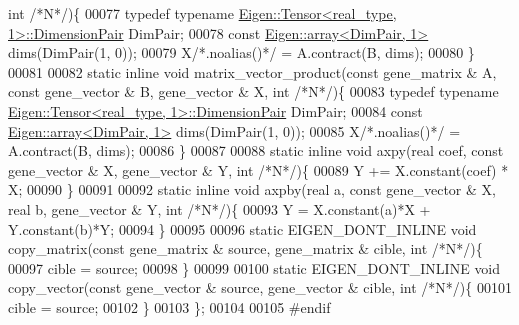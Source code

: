 \begin{DoxyCode}
{      int}  \textcolor{comment}{/*N*/})\{
00077     \textcolor{keyword}{typedef} \textcolor{keyword}{typename} \hyperlink{class_eigen_1_1_tensor}{Eigen::Tensor<real\_type, 1>::DimensionPair} 
      DimPair;
00078     \textcolor{keyword}{const} \hyperlink{class_eigen_1_1array}{Eigen::array<DimPair, 1>} dims(DimPair(1, 0));
00079     X\textcolor{comment}{/*.noalias()*/} = A.contract(B, dims);
00080   \}
00081 
00082   \textcolor{keyword}{static} \textcolor{keyword}{inline} \textcolor{keywordtype}{void} matrix\_vector\_product(\textcolor{keyword}{const} gene\_matrix & A, \textcolor{keyword}{const} gene\_vector & B, gene\_vector & X, \textcolor{keywordtype}{
      int}  \textcolor{comment}{/*N*/})\{
00083     \textcolor{keyword}{typedef} \textcolor{keyword}{typename} \hyperlink{class_eigen_1_1_tensor}{Eigen::Tensor<real\_type, 1>::DimensionPair} 
      DimPair;
00084     \textcolor{keyword}{const} \hyperlink{class_eigen_1_1array}{Eigen::array<DimPair, 1>} dims(DimPair(1, 0));
00085     X\textcolor{comment}{/*.noalias()*/} = A.contract(B, dims);
00086   \}
00087 
00088   \textcolor{keyword}{static} \textcolor{keyword}{inline} \textcolor{keywordtype}{void} axpy(real coef, \textcolor{keyword}{const} gene\_vector & X, gene\_vector & Y, \textcolor{keywordtype}{int}  \textcolor{comment}{/*N*/})\{
00089     Y += X.constant(coef) * X;
00090   \}
00091 
00092   \textcolor{keyword}{static} \textcolor{keyword}{inline} \textcolor{keywordtype}{void} axpby(real a, \textcolor{keyword}{const} gene\_vector & X, real b, gene\_vector & Y, \textcolor{keywordtype}{int}  \textcolor{comment}{/*N*/})\{
00093     Y = X.constant(a)*X + Y.constant(b)*Y;
00094   \}
00095 
00096   \textcolor{keyword}{static} EIGEN\_DONT\_INLINE \textcolor{keywordtype}{void} copy\_matrix(\textcolor{keyword}{const} gene\_matrix & source, gene\_matrix & cible, \textcolor{keywordtype}{int}  \textcolor{comment}{/*N*/})\{
00097     cible = source;
00098   \}
00099 
00100   \textcolor{keyword}{static} EIGEN\_DONT\_INLINE \textcolor{keywordtype}{void} copy\_vector(\textcolor{keyword}{const} gene\_vector & source, gene\_vector & cible, \textcolor{keywordtype}{int}  \textcolor{comment}{/*N*/})\{
00101     cible = source;
00102   \}
00103 \};
00104 
00105 \textcolor{preprocessor}{#endif}
\end{DoxyCode}
